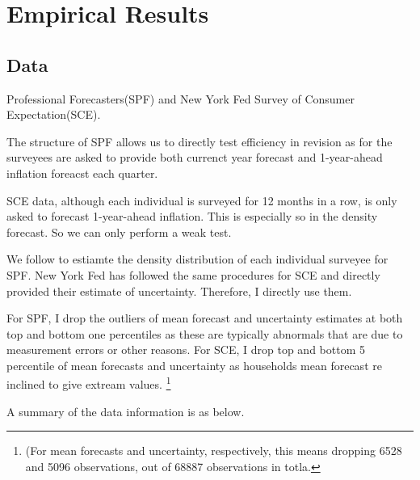 \documentclass[]{article}
\begin{document}
\section{Empirical Results}\label{empirical}

\subsection{Data}


Professional Forecasters(SPF) and New York Fed Survey of Consumer Expectation(SCE). 

The structure of SPF allows us to directly test efficiency in revision as for the surveyees are asked to provide both currenct year forecast and 1-year-ahead inflation foreacst each quarter. 

SCE data, although each individual is surveyed for 12 months in a row, is only asked to forecast 1-year-ahead inflation. This is especially so in the density forecast. So we can only perform a weak test. 

We follow \citet{engelberg2009comparing} to estiamte the density distribution of each individual surveyee for SPF. New York Fed has followed the same procedures for SCE and directly provided their estimate of uncertainty. Therefore, I directly use them. 

For SPF, I drop the outliers of mean forecast and uncertainty estimates at both top and bottom one percentiles as these are typically abnormals that are due to measurement errors or other reasons.   For SCE, I drop top and bottom 5 percentile of mean forecasts and uncertainty as households mean forecast re inclined to give extream values. \footnote{(For mean forecasts and uncertainty, respectively, this means dropping 6528 and 5096 observations, out of 68887 observations in totla.}


A summary of the data information is as below. 
\end{document}

